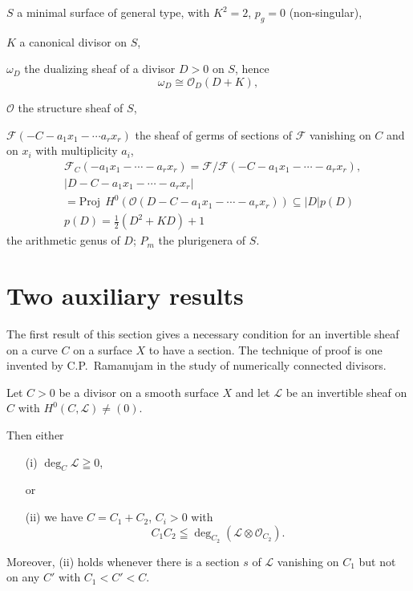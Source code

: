 $S$ a minimal surface of general type, with $K^{2}=2$, $p_{g}=0$
(non-singular),

$K$ a canonical divisor on $S$,

$\omega_{D}$ the dualizing sheaf of a divisor $D>0$ on $S$, hence
$$
\omega_{D}\cong \mathscr{O}_{D}(D+K),
$$

$\mathscr{O}$ the structure sheaf of $S$,

$\mathscr{F}(-C-a_{1}x_{1}-\cdots a_{r}x_{r})$ the sheaf of germs of
sections of $\mathscr{F}$ vanishing on $C$ and on $x_{i}$ with
multiplicity $a_{i}$, 
\begin{align*}
& \mathscr{F}_{C}(-a_{1}x_{1}-\cdots-a_{r}x_{r})=\mathscr{F}/\mathscr{F}(-C-a_{1}x_{1}-\cdots-a_{r}x_{r}),\\
& |D-C-a_{1}x_{1}-\cdots-a_{r}x_{r}|\\
& =\text{Proj}~~ H^{0}(\mathscr{O}(D-C-a_{1}x_{1}-\cdots-a_{r}x_{r}))\subseteq
|D|p(D)\\
& p(D)=\frac{1}{2}(D^{2}+KD)+1
\end{align*}\pageoriginale
the arithmetic genus of $D$; $P_{m}$ the plurigenera of $S$.

\section{Two auxiliary results}\label{art04-sec2}

The first result of this section gives a necessary condition for an
invertible sheaf on a curve $C$ on a surface $X$ to have a
section. The technique of proof is one invented by C.P.~Ramanujam in
the study of numerically connected divisors.


\begin{alphprop}\label{art04-propA}
Let $C>0$ be a divisor on a smooth surface $X$ and let $\mathscr{L}$ be an invertible sheaf on $C$ with $H^{0}(C,\mathscr{L})\neq (0)$.

Then either
\begin{itemize}
\item[\rm(i)] $\deg_{C}\mathscr{L}\geqq 0$,

or

\item[\rm(ii)] we have $C=C_{1}+C_{2}$, $C_{i}>0$ with
$$
C_{1}C_{2}\leqq \deg_{C_{2}}(\mathscr{L}\otimes \mathscr{O}_{C_{2}}).
$$
\end{itemize}
Moreover, {\rm(ii)} holds whenever there is a section $s$ of
$\mathscr{L}$ vanishing on $C_{1}$ but not on any $C'$ with $C_{1}<C'<C$.
\end{alphprop}

